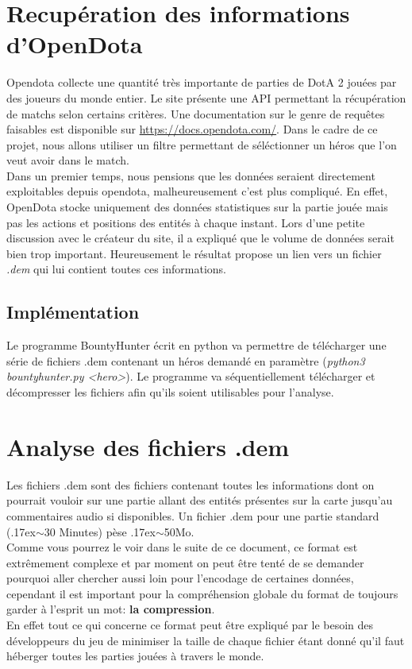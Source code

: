 \documentclass{article}
\begin{document}
\section{Recupération des informations d'OpenDota}

Opendota collecte une quantité très importante de parties de DotA 2 jouées par des joueurs du monde entier. Le site présente une API permettant la récupération de matchs selon certains critères. Une documentation sur le genre de requêtes faisables est disponible sur \url{https://docs.opendota.com/}. Dans le cadre de ce projet, nous allons utiliser un filtre permettant de séléctionner un héros que l'on veut avoir dans le match.\\
Dans un premier temps, nous pensions que les données seraient directement exploitables depuis opendota, malheureusement c'est plus compliqué. En effet, OpenDota stocke uniquement des données statistiques sur la partie jouée mais pas les actions et positions des entités à chaque instant. Lors d'une petite discussion avec le créateur du site, il a expliqué que le volume de données serait bien trop important. Heureusement le résultat propose un lien vers un fichier \textit{.dem} qui lui contient toutes ces informations.

\subsection{Implémentation}

Le programme BountyHunter écrit en python va permettre de télécharger une série de fichiers .dem contenant un héros demandé en paramètre (\textit{python3 bountyhunter.py <hero>}). Le programme va séquentiellement télécharger et décompresser les fichiers afin qu'ils soient utilisables pour l'analyse.

\section{Analyse des fichiers .dem}

Les fichiers .dem sont des fichiers contenant toutes les informations dont on pourrait vouloir sur une partie allant des entités présentes sur la carte jusqu'au commentaires audio si disponibles. Un fichier .dem pour une partie standard ({\raise.17ex\hbox{$\scriptstyle\mathtt{\sim}$}}30 Minutes) pèse {\raise.17ex\hbox{$\scriptstyle\mathtt{\sim}$}}50Mo.\\
Comme vous pourrez le voir dans le suite de ce document, ce format est extrêmement complexe et par moment on peut être tenté de se demander pourquoi aller chercher aussi loin pour l'encodage de certaines données, cependant il est important pour la compréhension globale du format de toujours garder à l'esprit un mot: \textbf{la compression}.\\
En effet tout ce qui concerne ce format peut être expliqué par le besoin des développeurs du jeu de minimiser la taille de chaque fichier étant donné qu'il faut héberger toutes les parties jouées à travers le monde. 
\end{document}
